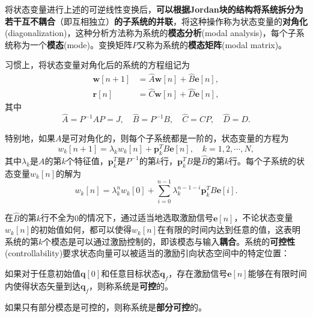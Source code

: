 将状态变量进行上述的可逆线性变换后，\textbf{可以根据Jordan块的结构将系统拆分为若干互不耦合}（即互相独立）\textbf{的子系统的并联}，将这种操作称为状态变量的\textbf{对角化}(diagonalization)，这种分析方法称为系统的\textbf{模态分析}(modal analysis)，每个子系统称为一个\textbf{模态}(mode)。变换矩阵$P$又称为系统的\textbf{模态矩阵}(modal matrix)。

习惯上，将状态变量对角化后的系统的方程组记为
\begin{equation}
    \begin{aligned}
        \mathbf{w}[n+1]&=\hat{A}\mathbf{w}[n]+\hat{B}\mathbf{e}[n], \\
        \mathbf{r}[n]&=\hat{C}\mathbf{w}[n]+\hat{D}\mathbf{e}[n],
    \end{aligned}
\end{equation}
其中
\begin{equation}
    \hat{A}=P^{-1}AP=J,\quad \hat{B}=P^{-1}B,\quad \hat{C}=CP,\quad \hat{D}=D.
\end{equation}

特别地，如果$A$是可对角化的，则每个子系统都是一阶的，状态变量的方程为
\begin{equation}
    w_k[n+1]=\lambda_k w_k[n]+\mathbf{p}_k^T B\mathbf{e}[n],\quad k=1,2,\cdots,N,
\end{equation}
其中$\lambda_k$是$A$的第$k$个特征值，$\mathbf{p}_k^T$是$P^{-1}$的第$k$行，$\mathbf{p}_k^T B$是$\hat{B}$的第$k$行。每个子系统的状态变量$w_k[n]$的解为
\begin{equation}
    w_k[n]=\lambda_k^n w_k[0]+\sum_{i=0}^{n-1}\lambda_k^{n-1-i}\mathbf{p}_k^T B\mathbf{e}[i].
\end{equation}

在$\hat{B}$的第$k$行不全为$0$的情况下，通过适当地选取激励信号$\mathbf{e}[n]$，不论状态变量$w_k[n]$的初始值如何，都可以使得$w_k[n]$在有限的时间内达到任意的值，这表明系统的第$k$个模态是可以通过激励控制的，即该模态与输入\textbf{耦合}。系统的\textbf{可控性}(controllability)要求状态向量可以被适当的激励引向状态空间中的特定位置：

\begin{definition}[可控性]
    如果对于任意初始值$\mathbf{q}[0]$和任意目标状态$\mathbf{q}_f$，存在激励信号$\mathbf{e}[n]$能够在有限时间内使得状态矢量到达$\mathbf{q}_f$，则称系统是\textbf{可控}的。

    如果只有部分模态是可控的，则称系统是\textbf{部分可控}的。
\end{definition}

